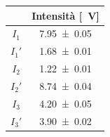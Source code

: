 \documentclass[10pt,oneside,a4paper]{article}
\begin{document}
\hspace{1em}
\begin{minipage}[t]{.33\linewidth}
\begin{center}
\label{tab:stokesHeNe}
\begin{tabular}{c|c}
& Intensità [\SI{}{V}]  \\
\hline
     $I_1$  &        \SI{7.95 \pm 0.05}{} \\
     $I_1'$  &       \SI{1.68 \pm 0.01}{} \\
     \hline 
     $I_2$  &        \SI{1.22 \pm 0.01}{} \\
     $I_2'$  &       \SI{8.74 \pm 0.04}{} \\
     \hline 
     $I_3$  &        \SI{4.20 \pm 0.05}{} \\
     $I_3'$	&		 \SI{3.90 \pm 0.02}{} \\
\hline
\end{tabular}
\end{center}
\end{minipage}
\newline

\vspace{1cm}
\end{document}
